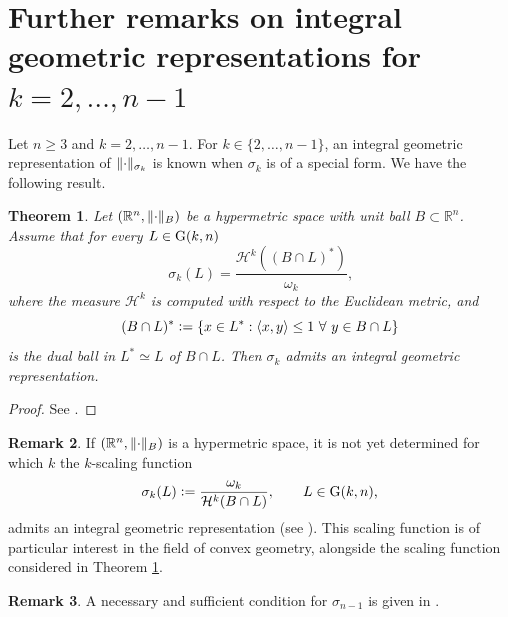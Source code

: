 \documentclass{article}
\numberwithin{equation}{section}
\theoremstyle{plain}%
\newtheorem{theorem}{Theorem}[section]
\theoremstyle{definition}
\newtheorem{rem}[theorem]{Remark}
\theoremstyle{definition}
\newcommand{\rgrande}{\mathbb{R}}
\newcommand{\haus}{\mathcal{H}}
\newcommand{\grass}{{\rm G}}
\DeclarePairedDelimiter{\norma}{\lVert}{\rVert} %
\newcommand{\prodscal}[2]{\langle{#1} , {#2} \rangle}
\begin{document}
\section{Further remarks on integral geometric representations for $k = 2, \ldots, n-1$}\label{sec:igperkgenerico}
Let $n \geq 3$ and $k = 2, \ldots, n-1$.
For $k\in\{2,\ldots,n-1\}$, an integral geometric representation of $\norma{\cdot}_{\sigma_k}$ is known when $\sigma_k$ is of a special form. We have the following result.
\begin{theorem}\label{thrapproperkgenerico}
    Let $(\rgrande^n, \norma{\cdot}_B)$ be a hypermetric space with unit ball $B \subset \rgrande^n$. Assume that for every $L \in \grass(k,n)$
    $$
    \sigma_k (L) = \frac{  \haus^k((B \cap L)^*) }{\omega_k}
    \text{,}
    $$
    where the measure $\haus^k$ is computed with respect to the Euclidean metric, and $$(B \cap L)^* \vcentcolon = \{ x \in L^* : \prodscal{x}{y} \leq 1 \ \forall \ y \in B \cap L \}$$ is the dual ball in $L^* \simeq L$ of $B \cap L$.
    Then $\sigma_k$ admits an integral geometric representation.
\end{theorem}
\begin{proof}
    See \cite[Sect. 7]{MR1462734}.
\end{proof}
\begin{rem}
    If $(\rgrande^n, \norma{\cdot}_B)$ is a hypermetric space, it is not yet determined for which $k$ the $k$-scaling function
    $$\sigma_k(L) \vcentcolon = \frac{\omega_k}{\haus^k(B \cap L)}, \qquad L \in \grass(k,n)
    \text{,}
    $$
    admits an integral geometric representation (see \cite[Sect. 4]{MR1462734}). This scaling function is of particular interest in the field of convex geometry, alongside the scaling function considered in Theorem \ref{thrapproperkgenerico}.
\end{rem}

\begin{rem}
    A necessary and sufficient condition for $\sigma_{n-1}$ is given in \cite[Sect. 3]{MR1462734}.
\end{rem}

\printbibliography
\end{document}
